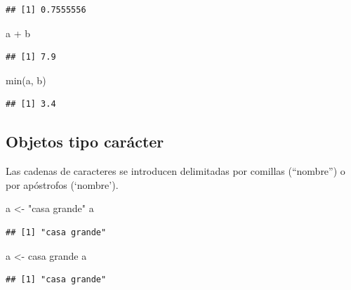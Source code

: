 \documentclass[
]{book}
\newenvironment{Shaded}{\begin{snugshade}}{\end{snugshade}}
\newcommand{\FunctionTok}[1]{\textcolor[rgb]{0.00,0.00,0.00}{#1}}
\newcommand{\NormalTok}[1]{#1}
\newcommand{\OtherTok}[1]{\textcolor[rgb]{0.56,0.35,0.01}{#1}}
\newcommand{\SpecialCharTok}[1]{\textcolor[rgb]{0.00,0.00,0.00}{#1}}
\newcommand{\StringTok}[1]{\textcolor[rgb]{0.31,0.60,0.02}{#1}}
\theoremstyle{break}
\theoremstyle{nonumberplain}
\begin{document}
\begin{verbatim}
## [1] 0.7555556
\end{verbatim}

\begin{Shaded}
\begin{Highlighting}[]
\NormalTok{a }\SpecialCharTok{+}\NormalTok{ b}
\end{Highlighting}
\end{Shaded}

\begin{verbatim}
## [1] 7.9
\end{verbatim}

\begin{Shaded}
\begin{Highlighting}[]
\FunctionTok{min}\NormalTok{(a, b)}
\end{Highlighting}
\end{Shaded}

\begin{verbatim}
## [1] 3.4
\end{verbatim}

\hypertarget{objetos-tipo-caruxe1cter}{%
\subsection{Objetos tipo carácter}\label{objetos-tipo-caruxe1cter}}

Las cadenas de caracteres
se introducen delimitadas por comillas (``nombre'') o por apóstrofos
(`nombre').

\begin{Shaded}
\begin{Highlighting}[]
\NormalTok{a }\OtherTok{\textless{}{-}} \StringTok{"casa grande"}
\NormalTok{a}
\end{Highlighting}
\end{Shaded}

\begin{verbatim}
## [1] "casa grande"
\end{verbatim}

\begin{Shaded}
\begin{Highlighting}[]
\NormalTok{a }\OtherTok{\textless{}{-}} \StringTok{\textquotesingle{}casa grande\textquotesingle{}}
\NormalTok{a}
\end{Highlighting}
\end{Shaded}

\begin{verbatim}
## [1] "casa grande"
\end{verbatim}
\end{document}
